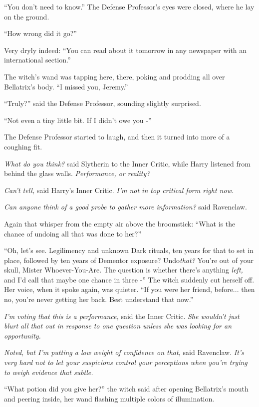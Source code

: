 ``You don't need to know.'' The Defense Professor's eyes were closed,
where he lay on the ground.

``How wrong did it go?''

Very dryly indeed: ``You can read about it tomorrow in any newspaper
with an international section.''

The witch's wand was tapping here, there, poking and prodding all over
Bellatrix's body. ``I missed you, Jeremy.''

``Truly?'' said the Defense Professor, sounding slightly surprised.

``Not even a tiny little bit. If I didn't owe you -''

The Defense Professor started to laugh, and then it turned into more of
a coughing fit.

\emph{What do you think?} said Slytherin to the Inner Critic, while
Harry listened from behind the glass walls. \emph{Performance, or
reality?}

\emph{Can't tell,} said Harry's Inner Critic. \emph{I'm not in top
critical form right now.}

\emph{Can anyone think of a good probe to gather more information?} said
Ravenclaw.

Again that whisper from the empty air above the broomstick: ``What is
the chance of undoing all that was done to her?''

``Oh, let's see. Legilimency and unknown Dark rituals, ten years for that
to set in place, followed by ten years of Dementor exposure?
Undo\emph{that?} You're out of your skull, Mister Whoever-You-Are. The
question is whether there's anything \emph{left,} and I'd call that
maybe one chance in three -'' The witch suddenly cut herself off. Her
voice, when it spoke again, was quieter. ``If you were her friend,
before... then no, you're never getting her back. Best understand
that now.''

\emph{I'm voting that this is a performance,} said the Inner Critic.
\emph{She wouldn't just blurt all that out in response to one question
unless she was looking for an opportunity.}

\emph{Noted, but I'm putting a low weight of confidence on that,} said
Ravenclaw. \emph{It's very hard not to let your suspicions control your
perceptions when you're trying to weigh evidence that subtle.}

``What potion did you give her?'' the witch said after opening
Bellatrix's mouth and peering inside, her wand flashing multiple colors
of illumination.

